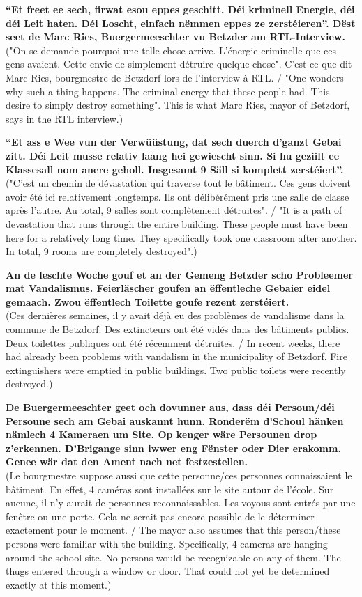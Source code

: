 \textbf{“Et freet ee sech, firwat esou eppes geschitt. Déi kriminell Energie, déi déi Leit haten. Déi Loscht, einfach nëmmen eppes ze zerstéieren”. Dëst seet de Marc Ries, Buergermeeschter vu Betzder am RTL-Interview.} \\
("On se demande pourquoi une telle chose arrive. L'énergie criminelle que ces gens avaient. Cette envie de simplement détruire quelque chose". C'est ce que dit Marc Ries, bourgmestre de Betzdorf lors de l'interview à RTL. / "One wonders why such a thing happens. The criminal energy that these people had. This desire to simply destroy something". This is what Marc Ries, mayor of Betzdorf, says in the RTL interview.)

\textbf{“Et ass e Wee vun der Verwüüstung, dat sech duerch d’ganzt Gebai zitt. Déi Leit musse relativ laang hei gewiescht sinn. Si hu geziilt ee Klassesall nom anere geholl. Insgesamt 9 Säll si komplett zerstéiert”.} \\
("C'est un chemin de dévastation qui traverse tout le bâtiment. Ces gens doivent avoir été ici relativement longtemps. Ils ont délibérément pris une salle de classe après l'autre. Au total, 9 salles sont complètement détruites". / "It is a path of devastation that runs through the entire building. These people must have been here for a relatively long time. They specifically took one classroom after another. In total, 9 rooms are completely destroyed".)

\textbf{An de leschte Woche gouf et an der Gemeng Betzder scho Probleemer mat Vandalismus. Feierläscher goufen an ëffentleche Gebaier eidel gemaach. Zwou ëffentlech Toilette goufe rezent zerstéiert.} \\
(Ces dernières semaines, il y avait déjà eu des problèmes de vandalisme dans la commune de Betzdorf. Des extincteurs ont été vidés dans des bâtiments publics. Deux toilettes publiques ont été récemment détruites. / In recent weeks, there had already been problems with vandalism in the municipality of Betzdorf. Fire extinguishers were emptied in public buildings. Two public toilets were recently destroyed.)

\textbf{De Buergermeeschter geet och dovunner aus, dass déi Persoun/déi Persoune sech am Gebai auskannt hunn. Ronderëm d’Schoul hänken nämlech 4 Kameraen um Site. Op kenger wäre Persounen drop z’erkennen. D’Brigange sinn iwwer eng Fënster oder Dier erakomm. Genee wär dat den Ament nach net festzestellen.} \\
(Le bourgmestre suppose aussi que cette personne/ces personnes connaissaient le bâtiment. En effet, 4 caméras sont installées sur le site autour de l'école. Sur aucune, il n'y aurait de personnes reconnaissables. Les voyous sont entrés par une fenêtre ou une porte. Cela ne serait pas encore possible de le déterminer exactement pour le moment. / The mayor also assumes that this person/these persons were familiar with the building. Specifically, 4 cameras are hanging around the school site. No persons would be recognizable on any of them. The thugs entered through a window or door. That could not yet be determined exactly at this moment.)

